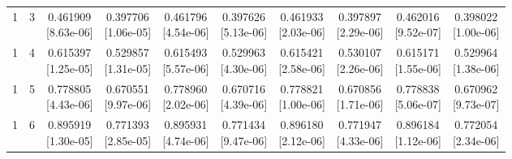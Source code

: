 \documentclass[12pt,letterpaper]{article}
\theoremstyle{plain}
\theoremstyle{definition}
\begin{document}
\begin{table}[p]
\begin{adjustbox}{max width=\linewidth}
\begin{tabular}{@{}rr*{8}{c}@{}}
1 & 3 & \shortstack{0.461909\\[-1pt]{\scriptsize[8.63e-06]}} & \shortstack{0.397706\\[-1pt]{\scriptsize[1.06e-05]}} & \shortstack{0.461796\\[-1pt]{\scriptsize[4.54e-06]}} & \shortstack{0.397626\\[-1pt]{\scriptsize[5.13e-06]}} & \shortstack{0.461933\\[-1pt]{\scriptsize[2.03e-06]}} & \shortstack{0.397897\\[-1pt]{\scriptsize[2.29e-06]}} & \shortstack{0.462016\\[-1pt]{\scriptsize[9.52e-07]}} & \shortstack{0.398022\\[-1pt]{\scriptsize[1.00e-06]}}\\
1 & 4 & \shortstack{0.615397\\[-1pt]{\scriptsize[1.25e-05]}} & \shortstack{0.529857\\[-1pt]{\scriptsize[1.31e-05]}} & \shortstack{0.615493\\[-1pt]{\scriptsize[5.57e-06]}} & \shortstack{0.529963\\[-1pt]{\scriptsize[4.30e-06]}} & \shortstack{0.615421\\[-1pt]{\scriptsize[2.58e-06]}} & \shortstack{0.530107\\[-1pt]{\scriptsize[2.26e-06]}} & \shortstack{0.615171\\[-1pt]{\scriptsize[1.55e-06]}} & \shortstack{0.529964\\[-1pt]{\scriptsize[1.38e-06]}}\\
1 & 5 & \shortstack{0.778805\\[-1pt]{\scriptsize[4.43e-06]}} & \shortstack{0.670551\\[-1pt]{\scriptsize[9.97e-06]}} & \shortstack{0.778960\\[-1pt]{\scriptsize[2.02e-06]}} & \shortstack{0.670716\\[-1pt]{\scriptsize[4.39e-06]}} & \shortstack{0.778821\\[-1pt]{\scriptsize[1.00e-06]}} & \shortstack{0.670856\\[-1pt]{\scriptsize[1.71e-06]}} & \shortstack{0.778838\\[-1pt]{\scriptsize[5.06e-07]}} & \shortstack{0.670962\\[-1pt]{\scriptsize[9.73e-07]}}\\
1 & 6 & \shortstack{0.895919\\[-1pt]{\scriptsize[1.30e-05]}} & \shortstack{0.771393\\[-1pt]{\scriptsize[2.85e-05]}} & \shortstack{0.895931\\[-1pt]{\scriptsize[4.74e-06]}} & \shortstack{0.771434\\[-1pt]{\scriptsize[9.47e-06]}} & \shortstack{0.896180\\[-1pt]{\scriptsize[2.12e-06]}} & \shortstack{0.771947\\[-1pt]{\scriptsize[4.33e-06]}} & \shortstack{0.896184\\[-1pt]{\scriptsize[1.12e-06]}} & \shortstack{0.772054\\[-1pt]{\scriptsize[2.34e-06]}}\\

\end{tabular}
\end{adjustbox}
\end{table}
\end{document}
